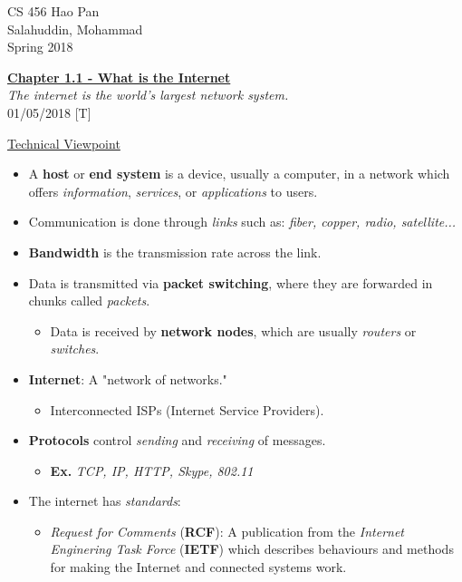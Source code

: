 \documentclass[11pt]{article}
\begin{document}
\noindent
{CS 456 \hfill Hao Pan}\\
{Salahuddin, Mohammad}\\
{Spring 2018}


\begin{center}
\underline{\large \bf Chapter 1.1 - What is the Internet}\\

{\it The internet is the world's largest network system.}\\

\noindent
{\hfill 01/05/2018 [T]}
\end{center}

\underline{Technical Viewpoint}

\begin{itemize}
\item A {\bf host} or {\bf end system} is a device, usually a computer, in a network which offers {\it information}, {\it services}, or {\it applications} to users.
\item Communication is done through {\it links} such as: {\it fiber, copper, radio, satellite...}
\item {\bf Bandwidth} is the transmission rate across the link.
\item Data is transmitted via {\bf packet switching}, where they are forwarded in chunks called {\it packets}.
\begin{itemize}
\item Data is received by {\bf network nodes}, which are usually {\it routers} or {\it switches}.
\end{itemize}

\item {\bf Internet}: A "network of networks."
\begin{itemize}
\item Interconnected ISPs (Internet Service Providers).
\end{itemize}
\item {\bf Protocols} control {\it sending} and {\it receiving} of messages.
\begin{itemize}
\item {\bf Ex.} {\it TCP, IP, HTTP, Skype, 802.11}
\end{itemize}
\item The internet has {\it standards}:
\begin{itemize}
\item {\it Request for Comments} ({\bf RCF}): A publication from the {\it Internet Enginering Task Force} ({\bf IETF}) which describes behaviours and methods for making the Internet and connected systems work.
\end{itemize}
\end{itemize}
\end{document}
